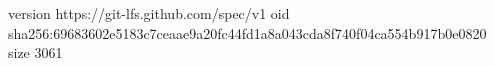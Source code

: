 version https://git-lfs.github.com/spec/v1
oid sha256:69683602e5183c7ceaae9a20fc44fd1a8a043cda8f740f04ca554b917b0e0820
size 3061
